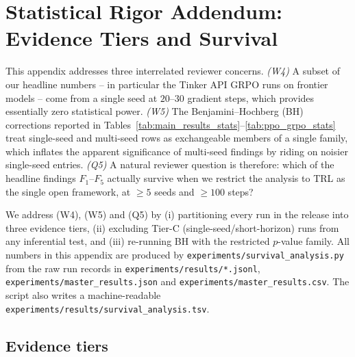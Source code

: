 %
%
%

\section{Statistical Rigor Addendum: Evidence Tiers and Survival}
\label{sec:stat_rigor}
\label{app:stat-rigor-addendum}

This appendix addresses three interrelated reviewer concerns. \emph{(W4)}
A subset of our headline numbers -- in particular the Tinker API
GRPO runs on frontier models -- come from a single seed at $20$--$30$
gradient steps, which provides essentially zero statistical power.
\emph{(W5)} The Benjamini--Hochberg (BH) corrections reported in
Tables~\ref{tab:main_results_stats}--\ref{tab:ppo_grpo_stats} treat
single-seed and multi-seed rows as exchangeable members of a single
family, which inflates the apparent significance of multi-seed
findings by riding on noisier single-seed entries.
\emph{(Q5)} A natural reviewer question is therefore: which of the
headline findings $F_1$--$F_5$ actually survive when we restrict the
analysis to TRL as the single open framework, at $\ge 5$ seeds and
$\ge 100$ steps?

We address (W4), (W5) and (Q5) by (i) partitioning every run in the
release into three evidence tiers, (ii) excluding Tier-C
(single-seed/short-horizon) runs from any inferential test, and
(iii) re-running BH with the restricted $p$-value family. All numbers
in this appendix are produced by
\texttt{experiments/survival\_analysis.py} from the raw run records in
\texttt{experiments/results/*.jsonl},
\texttt{experiments/master\_results.json} and
\texttt{experiments/master\_results.csv}. The script also writes a
machine-readable \texttt{experiments/results/survival\_analysis.tsv}.

\subsection{Evidence tiers}
\label{sec:stat-rigor-addendum:tiers}

